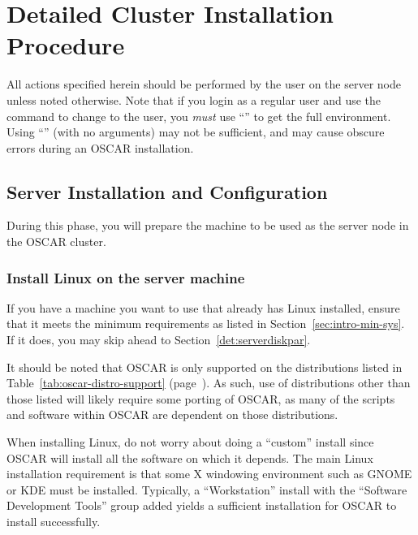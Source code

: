 %
%
%

\section{Detailed Cluster Installation Procedure}
\label{sec:detail}

All actions specified herein should be performed by the 
user on the server node unless noted otherwise.  Note that if you
login as a regular user and use the  command to change to the
 user, you {\em must} use ``'' to get the full
 environment.  Using ``'' (with no arguments) may
not be sufficient, and may cause obscure errors during an OSCAR
installation.


\subsection{Server Installation and Configuration}
\label{det:serverinstall}
  
During this phase, you will prepare the machine to be used as the
server node in the OSCAR cluster.


\subsubsection{Install Linux on the server machine} 
\label{det:serverosinstall}

\begchange

If you have a machine you want to use that already has Linux
installed, ensure that it meets the minimum requirements as listed in
Section~\ref{sec:intro-min-sys}.  If it does, you may skip ahead to
Section~\ref{det:serverdiskpar}.

It should be noted that OSCAR is only supported on the distributions
listed in Table~\ref{tab:oscar-distro-support}
(page~\pageref{tab:oscar-distro-support}).  As such, use of
distributions other than those listed will likely require some porting
of OSCAR, as many of the scripts and software within OSCAR are
dependent on those distributions. 

When installing Linux, do not worry about doing a ``custom'' install
since OSCAR will install all the software on which it depends.  The
main Linux installation requirement is that some X windowing
environment such as GNOME or KDE must be installed.  Typically, a
``Workstation'' install with the ``Software Development Tools'' group
added yields a sufficient installation for OSCAR to install
successfully.

